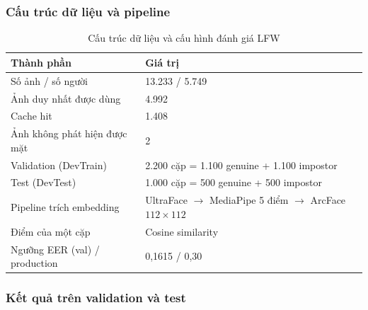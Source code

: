 \documentclass[12pt,a4paper]{article}
\begin{document}
\subsubsection{Cấu trúc dữ liệu và pipeline}
\begin{table}[H]
  \centering
  \caption{Cấu trúc dữ liệu và cấu hình đánh giá LFW}
  \label{tab:lfw-composition}
  \small
  \begin{tabular}{@{}ll@{}}
    \toprule
    \textbf{Thành phần} & \textbf{Giá trị}\\
    \midrule
    Số ảnh / số người & 13.233 / 5.749\\
    Ảnh duy nhất được dùng & 4.992\\
    Cache hit & 1.408\\
    Ảnh không phát hiện được mặt & 2\\
    Validation (DevTrain) & 2.200 cặp = 1.100 genuine + 1.100 impostor\\
    Test (DevTest) & 1.000 cặp = 500 genuine + 500 impostor\\
    Pipeline trích embedding & UltraFace $\rightarrow$ MediaPipe 5 điểm $\rightarrow$ ArcFace $112\times112$\\
    Điểm của một cặp & Cosine similarity\\
    Ngưỡng EER (val) / production & 0,1615 / 0,30\\
    \bottomrule
  \end{tabular}
\end{table}

\subsubsection{Kết quả trên validation và test}
\begin{table}[H]
  \centering
  \caption{Kết quả so khớp khuôn mặt (ArcFace) trên LFW, ngưỡng quyết định 0,30}
  \label{tab:face-lfw}
  \footnotesize
\end{table}
\end{document}
